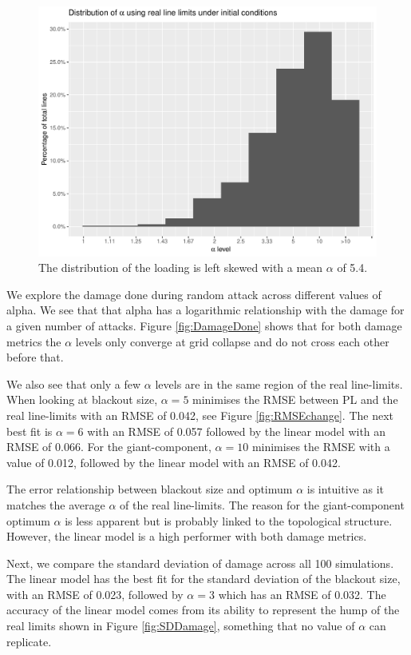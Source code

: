 \documentclass{article}
\begin{document}
\begin{figure}
    \centering
    \includegraphics{Figures/LoadLevel.pdf}
    \caption{The distribution of the loading is left skewed with a mean $\alpha$ of 5.4.}
    \label{fig:LoadLevel}
\end{figure}

We explore the damage done during random attack across different values of alpha. We see that that alpha has a logarithmic relationship with the damage for a given number of attacks. Figure \ref{fig:DamageDone} shows that for both damage metrics the $\alpha$ levels only converge at grid collapse and do not cross each other before that.

We also see that only a few $\alpha$ levels are in the same region of the real line-limits. When looking at blackout size, $\alpha = 5$ minimises the RMSE between PL and the real line-limits with an RMSE of 0.042, see Figure \ref{fig:RMSEchange}. The next best fit is $\alpha = 6$ with an RMSE of 0.057 followed by the linear model with an RMSE of 0.066. 
For the giant-component, $\alpha=10$ minimises the RMSE with a value of 0.012, followed by the linear model with an RMSE of 0.042.

The error relationship between blackout size and optimum $\alpha$ is intuitive as it matches the average $\alpha$ of the real line-limits. The reason for the giant-component optimum $\alpha$ is less apparent but is probably linked to the topological structure. However, the linear model is a high performer with both damage metrics.

Next, we compare the standard deviation of damage across all 100 simulations. The linear model has the best fit for the standard deviation of the blackout size, with an RMSE of 0.023, followed by $\alpha = 3$ which has an RMSE of 0.032. The accuracy of the linear model comes from its ability to represent the hump of the real limits shown in Figure \ref{fig:SDDamage}, something that no value of $\alpha$ can replicate.
\end{document}
